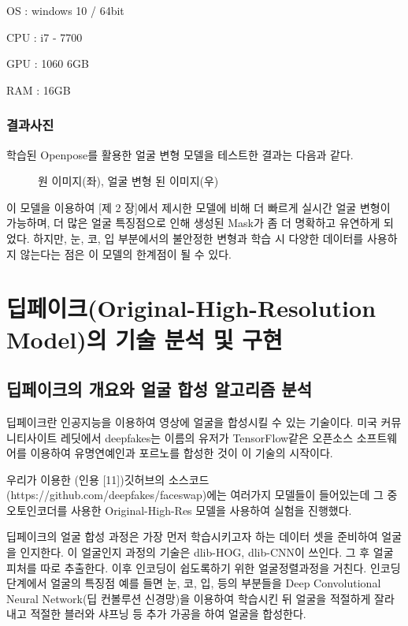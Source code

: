 \documentclass{oblivoir}
\begin{document}
OS : windows 10 / 64bit

CPU : i7 - 7700

GPU : 1060 6GB

RAM : 16GB

\subsection{ 결과사진 }

학습된 Openpose를 활용한 얼굴 변형 모델을 테스트한 결과는 다음과 같다.

\begin{figure}[h!]
    \centering
\caption{원 이미지(좌), 얼굴 변형 된 이미지(우)}
\end{figure}



이 모델을 이용하여 [제 2 장]에서 제시한 모델에 비해 더 빠르게 실시간 얼굴 변형이 가능하며, 더 많은 얼굴 특징점으로 인해 생성된 Mask가 좀 더 명확하고 유연하게 되었다. 하지만, 눈, 코, 입 부분에서의 불안정한 변형과 학습 시 다양한 데이터를 사용하지 않는다는 점은 이 모델의 한계점이 될 수 있다.

\chapter{딥페이크(Original-High-Resolution Model)의 기술 분석 및 구현}

\section{ 딥페이크의 개요와 얼굴 합성 알고리즘 분석}

딥페이크란 인공지능을 이용하여 영상에 얼굴을 합성시킬 수 있는 기술이다. 미국 커뮤니티사이트 레딧에서 deepfakes는 이름의 유저가 TensorFlow같은 오픈소스 소프트웨어를 이용하여 유명연예인과 포르노를 합성한 것이 이 기술의 시작이다.

우리가 이용한 (인용 [11])깃허브의 소스코드(https://github.com/deepfakes/faceswap)에는 여러가지 모델들이 들어있는데 그 중 오토인코더를 사용한 Original-High-Res 모델을 사용하여 실험을 진행했다.

딥페이크의 얼굴 합성 과정은 가장 먼저 학습시키고자 하는 데이터 셋을 준비하여 얼굴을 인지한다. 이 얼굴인지 과정의 기술은 dlib-HOG, dlib-CNN이 쓰인다. 그 후 얼굴 피처를 따로 추출한다. 이후 인코딩이 쉽도록하기 위한 얼굴정렬과정을 거친다. 인코딩 단계에서 얼굴의 특징점 예를 들면 눈, 코, 입, 등의 부분들을 Deep Convolutional Neural Network(딥 컨볼루션 신경망)을 이용하여 학습시킨 뒤 얼굴을 적절하게 잘라내고 적절한 블러와 샤프닝 등 추가 가공을 하여 얼굴을 합성한다.
\end{document}
